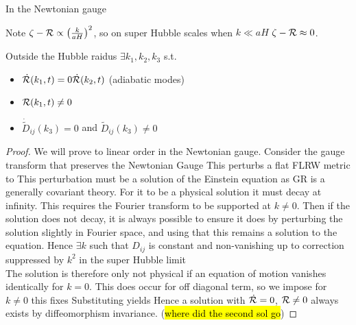 \documentclass{article}
\begin{document}
\begin{prop}
In the Newtonian gauge 
\end{prop}

Note $\zeta-\mathcal{R} \propto \left(\frac{k}{aH}\right)^2$, so on super Hubble scales when $k\ll aH$ $\zeta-\mathcal{R} \approx0$.

\begin{theorem}
Outside the Hubble raidus $\exists k_1, k_2, k_3$ s.t. 
\begin{itemize}
    \item $\dot{\mathcal{R}}(k_1,t) = 0 \dot{\mathcal{R}}(k_2,t)$ (adiabatic modes) 
    \item $\mathcal{R}(k_1,t) \neq 0$
    \item $\dot{\tilde{D}}_{ij}(k_3) = 0$ and $\tilde{D}_{ij}(k_3) \neq 0$
\end{itemize}
\end{theorem}
\begin{proof}
We will prove to linear order in the Newtonian gauge. 
Consider the gauge transform that preserves the Newtonian Gauge 
This perturbs a flat FLRW metric to 
This perturbation must be a solution of the Einstein equation as GR is a generally covariant theory. For it to be a physical solution it must decay at infinity. This requires the Fourier transform to be supported at $k \neq 0  $. Then if the solution does not decay, it is always possible to ensure it does by perturbing the solution slightly in Fourier space, and using that this remains a solution to the equation. Hence $\exists k$ such that $D_{ij}$ is constant and non-vanishing up to correction suppressed by $k^2$ in the super Hubble limit  \\
The solution is therefore only not physical if an equation of motion vanishes identically for $k=0$. This does occur for off diagonal term, so we impose for $k\neq 0$
this fixes 
Substituting yields 
Hence a solution with $\dot{\mathcal{R}}=0$, $\mathcal{R}\neq 0$ always exists by diffeomorphism invariance. (\hl{where did the second sol go})




\end{proof}
\end{document}
